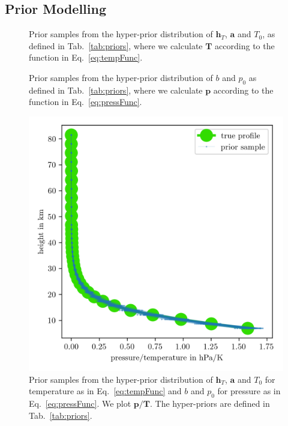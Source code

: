 \subsection{Prior Modelling}
\begin{figure}[ht!]
	\centering
	
	\caption[Prior Samples of $\bm{T}$ according to the respective hyper-prior distribution.]{Prior samples from the hyper-prior distribution of $\bm{h}_T$, $\bm{a}$ and $T_0$, as defined in Tab.~\ref{tab:priors}, where we calculate $\bm{T}$ according to the function in Eq.~\ref{eq:tempFunc}.}
	\label{fig:PriorTemp}
\end{figure}
\begin{figure}[ht!]
	\centering
	
	\caption[Prior Samples of $\bm{p}$ according to the respective hyper-prior distribution.]{Prior samples from the hyper-prior distribution of $b$ and $p_0$ as defined in Tab.~\ref{tab:priors}, where we calculate $\bm{p}$ according to the function in Eq.~\ref{eq:pressFunc}.}
	\label{fig:PriorPress}
\end{figure}
\begin{figure}[ht!]
	\centering
	\includegraphics{PriorTempOverPostMeanSigm.png}
	\caption[Prior Samples of $\bm{p}/\bm{T}$ according to the respective hyper-prior distribution.]{Prior samples from the hyper-prior distribution of $\bm{h}_T$, $\bm{a}$ and $T_0$ for temperature as in Eq.~\ref{eq:tempFunc} and $b$ and $p_0$ for pressure as in Eq.~\ref{eq:pressFunc}. We plot $\bm{p}/\bm{T}$. The hyper-priors are defined in Tab.~\ref{tab:priors}.}
	\label{fig:PriorPressOverTemp}
\end{figure}
